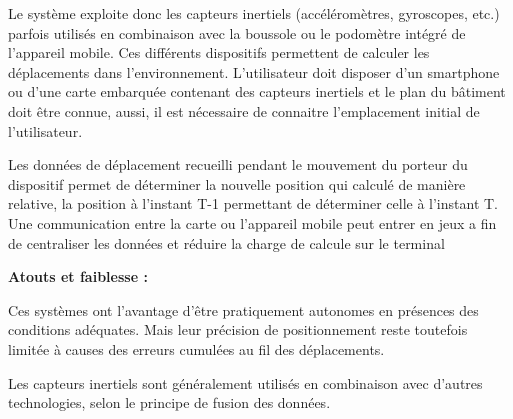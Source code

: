 \documentclass[12pt,a4paper]{report}
\begin{document}
	Le système exploite donc les capteurs inertiels (accéléromètres, gyroscopes, etc.) parfois utilisés en combinaison avec la boussole ou le podomètre intégré de l’appareil mobile. Ces différents dispositifs permettent de calculer les déplacements dans l’environnement. L’utilisateur doit disposer d’un smartphone ou d’une carte embarquée contenant des capteurs inertiels et le plan du bâtiment doit être connue, aussi, il est nécessaire de connaitre l’emplacement initial de l’utilisateur.
	
	Les données de déplacement recueilli pendant le mouvement du porteur du dispositif permet de déterminer la nouvelle position qui calculé de manière relative, la position à l’instant T-1 permettant de déterminer celle à l’instant T. Une communication entre la carte ou l’appareil mobile peut entrer en jeux a fin de centraliser les données et réduire la charge de calcule sur le terminal
	
	
\textbf{	Atouts et faiblesse :}
	
	Ces systèmes ont l’avantage d’être pratiquement autonomes en présences des conditions adéquates. Mais leur précision de positionnement reste toutefois limitée à causes des erreurs cumulées au fil des déplacements.
	
	
	Les  capteurs inertiels sont généralement utilisés en combinaison avec d’autres technologies, selon le principe de fusion des données.
	
\end{document}
